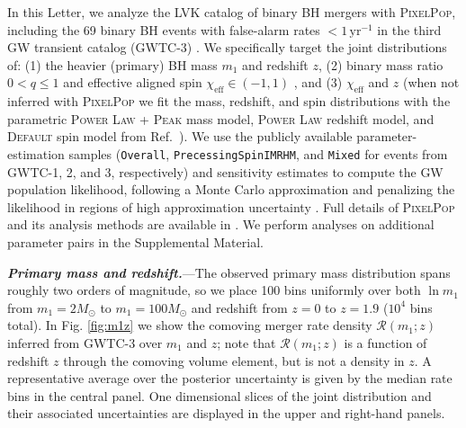 \documentclass[%
 reprint,
 amsmath,amssymb,
 aps,
 prd,
 nofootinbib,nobibnotes,
]{revtex4-2}
\newcommand{\heading}[1]{\textbf{\textit{#1.}}}
\begin{document}
In this Letter, we analyze the LVK catalog of binary BH mergers with \textsc{PixelPop}, including the 69 binary BH events with false-alarm rates $<1\,\mathrm{yr}^{-1}$ in the third GW transient catalog (GWTC-3) \cite{LIGOScientific:2021djp, KAGRA:2021duu}. We specifically target the joint distributions of: (1) the heavier (primary) BH mass $m_1$ and redshift $z$, (2) binary mass ratio $0<q\leq1$ and effective aligned spin $\chi_\mathrm{eff}\in(-1,1)$ \cite{Racine:2008qv}, and (3) $\chi_\mathrm{eff}$ and $z$ (when not inferred with \textsc{PixelPop} we fit the mass, redshift, and spin distributions with the parametric \textsc{Power Law + Peak} mass model, \textsc{Power Law} redshift model, and \textsc{Default} spin model from Ref.~\cite{KAGRA:2021duu}). We use the publicly available \cite{LIGOScientific:2019lzm, KAGRA:2023pio} parameter-estimation samples \cite{gwtc1_pe, gwtc2_pe, ligo_scientific_collaboration_and_virgo_2022_6513631, ligo_scientific_collaboration_and_virgo_2023_8177023} (\texttt{Overall}, \texttt{PrecessingSpinIMRHM}, and \texttt{Mixed} for events from GWTC-1, 2, and 3, respectively) and sensitivity estimates \cite{ligo_scientific_collaboration_and_virgo_2023_7890398} to compute the GW population likelihood, following a Monte Carlo approximation \cite{Thrane:2018qnx, Vitale2020, KAGRA:2021duu} and penalizing the likelihood in regions of high approximation uncertainty \cite{Farr:2019rap, Essick:2022ojx, Talbot:2023pex}. Full details of \textsc{PixelPop} and its analysis methods are available in \citeauthor{Heinzel:2024jlc} \cite{Heinzel:2024jlc}. We perform analyses on additional parameter pairs in the Supplemental Material.

\heading{Primary mass and redshift}---The observed primary mass distribution spans roughly two orders of magnitude, so we place 100 bins uniformly over both $\ln m_1$ from $m_1=2M_\odot$ to $m_1=100M_\odot$ and redshift from $z=0$ to $z=1.9$ ($10^4$ bins total). In Fig. \ref{fig:m1z} we show the comoving merger rate density $\mathcal{R}(m_1;z)$ inferred from GWTC-3 over $m_1$ and $z$; note that $\mathcal{R}(m_1;z)$ is a function of redshift $z$ through the comoving volume element, but is not a density in $z$. A representative average over the posterior uncertainty is given by the median rate bins in the central panel. One dimensional slices of the joint distribution and their associated uncertainties are displayed in the upper and right-hand panels.
\end{document}
